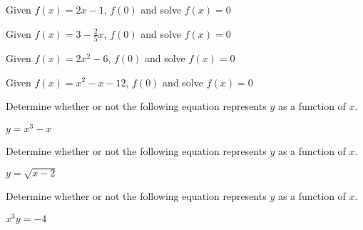 \documentclass{ximera}
\begin{document}

 





 

\begin{problem}\label{findzerofuncfirst}
Given $f(x) = 2x - 1$,
$f(0)$ and solve $f(x) = 0$
\end{problem}


\begin{problem}
Given $f(x) = 3 - \frac{2}{5} x$,
$f(0)$ and solve $f(x) = 0$
\end{problem}





\begin{problem}
Given $f(x) = 2x^2 - 6$,
$f(0)$ and solve $f(x) = 0$
\end{problem}

\begin{problem}\label{findzerofunclast}
Given $f(x) = x^2 - x - 12$,
$f(0)$ and solve $f(x) = 0$
\end{problem}










\begin{problem}\label{equfunctionfirst}
Determine whether or not the following equation represents $y$ as a function of $x$.

$y = x^{3} - x$
\end{problem}

\begin{problem}
Determine whether or not the following equation represents $y$ as a function of $x$.

$y = \sqrt{x - 2}$
\end{problem}

\begin{problem}
Determine whether or not the following equation represents $y$ as a function of $x$.

$x^{3}y = -4$ 
\end{problem}

\end{document}
